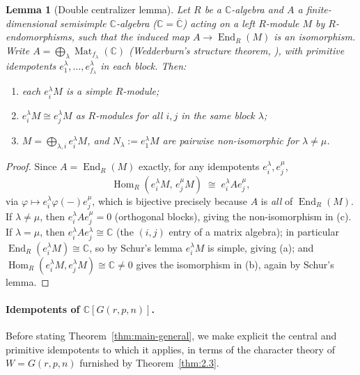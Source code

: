 \documentclass[11pt,a4paper]{article}
\newtheorem{lemma}[theorem]{Lemma}
\begin{document}
\begin{lemma}[Double centralizer lemma]\label{lem:double-centralizer}
Let $R$ be a $\mathbb{C}$-algebra and $A$ a finite-dimensional
semisimple $\mathbb{C}$-algebra ($\mathbb{C}=\overline{\mathbb{C}}$)
acting on a left $R$-module $M$ by $R$-endomorphisms, such that the
induced map $A \to \operatorname{End}_R(M)$ is an \emph{isomorphism}.
Write $A = \bigoplus_\lambda \operatorname{Mat}_{f_\lambda}(\mathbb{C})$
(Wedderburn's structure theorem, \cite[Chap.\ II, \S4]{Lang2002}),
with primitive idempotents
$e_1^\lambda,\dots,e_{f_\lambda}^\lambda$ in each block. Then:
\begin{enumerate}[label=(\alph*)]
  \item each $e_i^\lambda M$ is a simple $R$-module;
  \item $e_i^\lambda M \cong e_j^\lambda M$ as $R$-modules for all
    $i,j$ in the same block $\lambda$;
  \item $M = \bigoplus_{\lambda,i} e_i^\lambda M$, and
    $N_\lambda := e_1^\lambda M$ are pairwise non-isomorphic for
    $\lambda \ne \mu$.
\end{enumerate}
\end{lemma}

\begin{proof}
Since $A = \operatorname{End}_R(M)$ exactly, for any idempotents
$e_i^\lambda, e_j^\mu$,
\[
  \operatorname{Hom}_R(e_i^\lambda M,\, e_j^\mu M) \;\cong\; e_i^\lambda A e_j^\mu,
\]
via $\varphi \mapsto e_i^\lambda \varphi(-) e_j^\mu$, which is
bijective precisely because $A$ is \emph{all} of
$\operatorname{End}_R(M)$. If $\lambda \ne \mu$, then
$e_i^\lambda A e_j^\mu = 0$ (orthogonal blocks), giving the
non-isomorphism in (c). If $\lambda = \mu$, then
$e_i^\lambda A e_j^\lambda \cong \mathbb{C}$ (the $(i,j)$ entry of a
matrix algebra); in particular
$\operatorname{End}_R(e_i^\lambda M) \cong \mathbb{C}$, so by Schur's
lemma \cite[\S 1.4]{FultonHarris1991} $e_i^\lambda M$ is simple,
giving (a); and
$\operatorname{Hom}_R(e_i^\lambda M, e_j^\lambda M) \cong \mathbb{C} \ne 0$
gives the isomorphism in (b), again by Schur's lemma.
\end{proof}

\paragraph{Idempotents of $\mathbb{C}[G(r,p,n)]$.}
Before stating Theorem~\ref{thm:main-general}, we make explicit the
central and primitive idempotents to which it applies, in terms of
the character theory of $W = G(r,p,n)$ furnished by
Theorem~\ref{thm:2.3}.
\end{document}

